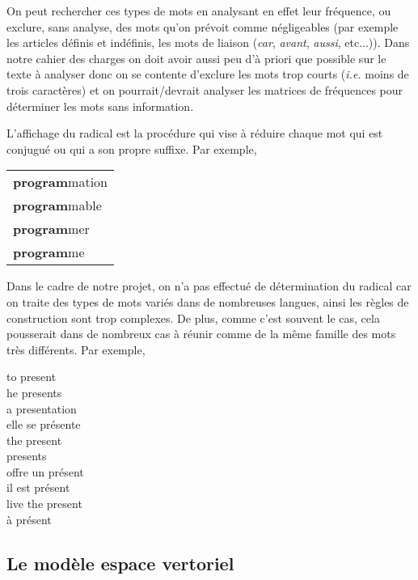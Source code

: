 On peut rechercher ces types de mots en analysant en effet
leur fréquence, ou exclure, sans analyse, des mots qu'on prévoit
comme négligeables (par exemple les articles définis et indéfinis,
les mots de liaison ({\it car}, {\it avant}, {\it aussi}, etc...)).
Dans notre cahier des charges on doit avoir aussi peu d'à priori
que possible sur le texte à analyser donc on se contente d'exclure
les mots trop courts ({\it i.e.} moins de trois caractères)
et on pourrait/devrait analyser les matrices de fréquences pour
déterminer les mots sans information.

L'affichage du radical est la procédure qui vise à réduire
chaque mot qui est conjugué ou qui a son propre suffixe.
Par exemple,

\begin{center}
\begin{tabular}{l}
{\bf program}mation \\
{\bf program}mable  \\
{\bf program}mer    \\
{\bf program}me     \\
\end{tabular}
\end{center}

Dans le cadre de notre projet, on n'a pas effectué
de détermination du radical car on traite des types
de mots variés dans de nombreuses langues,
ainsi les règles de construction sont trop complexes.
De plus, comme c'est souvent le cas, cela pousserait
dans de nombreux cas à réunir comme de la même famille
des mots très différents. Par exemple,

\begin{center}
\begin{multicols}{3}
to present \\
he presents \\
a presentation \\
elle se présente \\
\columnbreak
the present \\
presents \\
offre un présent \\
\columnbreak
il est présent \\
live the present \\
à présent
\end{multicols}
\end{center}

\subsection{Le modèle espace vertoriel}

